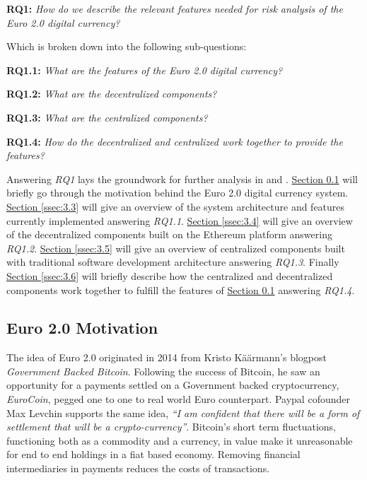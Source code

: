 \documentclass[12pt]{article} %
\newcommand{\hypernameref}[1]{\hyperref[#1]{\nameref{#1}}}
\newcommand{\hypersectionref}[1]{\hyperref[#1]{Section \ref{#1}}}
\begin{document}
\begin{quoting}
\textbf{RQ1:} \textit{How do we describe the relevant features needed for risk analysis of the Euro 2.0 digital currency?}
\end{quoting}

Which is broken down into the following sub-questions:
\begin{quoting}
	\textbf{RQ1.1: }\textit{What are the features of the Euro 2.0 digital currency?}
\end{quoting}{
\begin{quoting}
	\textbf{RQ1.2: }\textit{What are the decentralized components?}
\end{quoting}{
\begin{quoting}
	\textbf{RQ1.3: }\textit{What are the centralized components?}
\end{quoting}
\begin{quoting}
	\textbf{RQ1.4: }\textit{How do the decentralized and centralized work together to provide the features?}
\end{quoting}

Answering \textit{RQ1} lays the groundwork for further analysis in \hypernameref{sec:4} and \hypernameref{sec:5}. \hypersectionref{ssec:3.2} will briefly go through the motivation behind the Euro 2.0 digital currency system. \hypersectionref{ssec:3.3} will give an overview of the system architecture and features currently implemented answering \textit{RQ1.1}. \hypersectionref{ssec:3.4} will give an overview of the decentralized components built on the Ethereum platform answering \textit{RQ1.2}. \hypersectionref{ssec:3.5} will give an overview of centralized components built with traditional software development architecture answering \textit{RQ1.3}. Finally \hypersectionref{ssec:3.6} will briefly describe how the centralized and decentralized components work together to fulfill the features of \hypersectionref{ssec:3.2} answering \textit{RQ1.4}.

\subsection{Euro 2.0 Motivation} \label{ssec:3.2}

The idea of Euro 2.0 originated in 2014 from Kristo Käärmann's blogpost \textit{Government Backed Bitcoin}\cite{kaarmann2014government}. Following the success of Bitcoin, he saw an opportunity for a payments settled on a Government backed cryptocurrency, \textit{EuroCoin}, pegged one to one to real world Euro counterpart. Paypal cofounder Max Levchin supports the same idea, \textit{``I am confident that there will be a form of settlement that will be a crypto-currency''}\cite{pando2014levchin}. Bitcoin's short term fluctuations, functioning both as a commodity and a currency, in value make it unreasonable for end to end holdings in a fiat based economy. Removing financial intermediaries in payments reduces the costs of transactions.

}}
\end{document}
